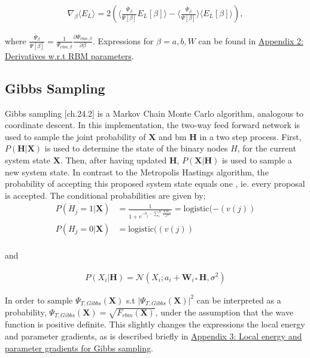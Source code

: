 \documentclass[%
oneside,                 %
final,                   %
10pt]{article}
\begin{document}
\begin{align*}
\nabla_{\beta} \langle E_L \rangle = 2 \left( \langle \frac{\bar \Psi_{\beta}}{\Psi [\beta]} E_L[\beta] \rangle - \langle \frac{\bar \Psi_{\beta}}{\Psi [\beta]} \rangle \langle E_L[\beta] \rangle  \right),
\end{align*}

where $\frac{\bar \Psi_{\beta}}{\Psi [\beta]} = \frac{1}{\Psi_{rbm,\beta} } \frac{\partial \Psi_{rbm,\beta}}{\partial \beta}$. Expressions for $\beta = a,b,W$ can be found in \hyperref[APP_2]{Appendix 2: Derivatives w.r.t RBM parameters}.

\subsection{Gibbs Sampling}
Gibbs sampling \cite{MLMurphy}[ch.24.2] is a Markov Chain Monte Carlo algorithm, analogous to coordinate descent. In this implementation, the two-way feed forward network is used to sample the joint probability of $\bm X$ and bm $\bm H$ in a two step process. First, $P(\bm H|\bm X)$ is used to determine the state of the binary nodes $ H$, for the current system state $\bm X$. Then, after having updated $\bm H$, $P(\bm X|\bm H)$ is used to sample a new system state. In contrast to the Metropolis Hastings algorithm, the probability of accepting this proposed system state equals one \cite{Flugsrud}, ie. every proposal is accepted. The conditional probabilities are given by;
\begin{equation}
\begin{aligned}
P(H_j=1|\bm X) & = \frac{1}{1+e^{-b_j-\sum_i^M \frac{X_i W_{ij}}{\sigma^2}}}=\text{logistic} (-(v(j)) \\
P(H_j=0|\bm X) & =\text{logistic} ((v(j)) \\
\end{aligned}
\label{eq:gibbs_prob_h}
\end{equation}

and

\begin{equation}
\begin{aligned}
P(X_i|\bm H) = \mathcal{N} (X_i;a_i+\bm W_{i*}\bm H,\sigma^2) 
\end{aligned}
\label{eq:gibbs_prob_x}
\end{equation}

In order to sample $\Psi_{T,Gibbs}(\bm X)$ s.t $\vert \Psi_{T,Gibbs}(\bm X) \vert^2$ can be interpreted as a probability, $\Psi_{T,Gibbs}(\bm X)=\sqrt{F_{rbm}(\bm X)}$, under the assumption that the wave function is positive definite. This slightly changes the expressions the local energy and parameter gradients, as is described briefly in \hyperref[APP_3]{Appendix 3: Local energy and parameter gradients for Gibbs sampling}. 
\end{document}
